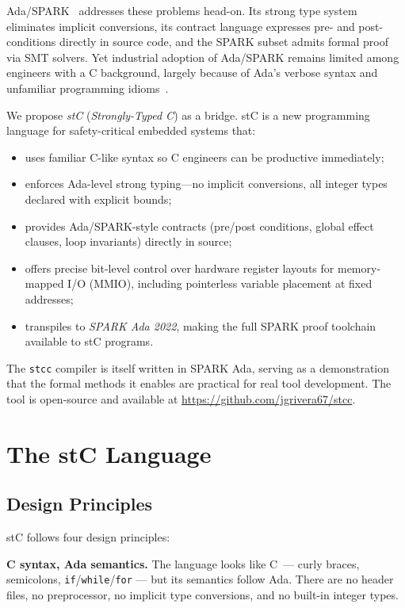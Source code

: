 \documentclass[runningheads]{llncs}
\begin{document}
Ada/SPARK~\cite{SparkAda} addresses these problems head-on. Its strong type system
eliminates implicit conversions, its contract language expresses pre- and
post-conditions directly in source code, and the SPARK subset admits formal proof
via SMT solvers. Yet industrial adoption of Ada/SPARK remains limited among
engineers with a C background, largely because of Ada's verbose syntax and
unfamiliar programming idioms~\cite{ada-industry}.

We propose \emph{stC} (\emph{Strongly-Typed C}) as a bridge. stC is a new
programming language for safety-critical embedded systems that:
\begin{itemize}
  \item uses familiar C-like syntax so C engineers can be productive immediately;
  \item enforces Ada-level strong typing---no implicit conversions, all integer
        types declared with explicit bounds;
  \item provides Ada/SPARK-style contracts (pre/post conditions, global effect
        clauses, loop invariants) directly in source;
  \item offers precise bit-level control over hardware register layouts for
        memory-mapped I/O (MMIO), including pointerless variable placement
        at fixed addresses;
  \item transpiles to \emph{SPARK Ada 2022}, making the full SPARK proof
        toolchain available to stC programs.
\end{itemize}

The \texttt{stcc} compiler is itself written in SPARK Ada, serving as a
demonstration that the formal methods it enables are practical for real
tool development. The tool is open-source and available at
\url{https://github.com/jgrivera67/stcc}.

\section{The stC Language}
\label{sec:language}

\subsection{Design Principles}

stC follows four design principles:

\noindent\textbf{C syntax, Ada semantics.}
The language looks like C~--- curly braces, semicolons, \texttt{if}/\texttt{while}/\texttt{for} ---
but its semantics follow Ada. There are no header files, no preprocessor,
no implicit type conversions, and no built-in integer types.
\end{document}
